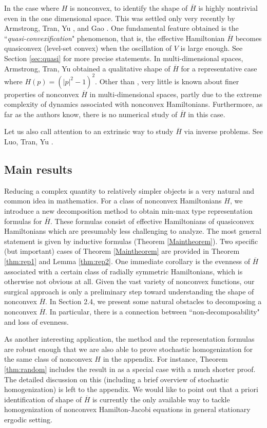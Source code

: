 \documentclass[12pt,reqno]{amsart}
\theoremstyle{plain}
\theoremstyle{remark}
\numberwithin{equation}{section}
\newcommand{\ol}{\overline}
\begin{document}
In the case where $H$ is nonconvex, to identify   the shape of $\ol{H}$ is highly nontrivial even in  the one dimensional space. 
This was settled only very recently by  Armstrong, Tran, Yu \cite{ATY2}, and Gao \cite{Gao}.  
One fundamental feature obtained is the  ``{\it quasi-convexification}" phenomenon, that is, 
the effective Hamiltonian $\ol H$ becomes quasiconvex (level-set convex)   when the oscillation of $V$ is large enough. 
See Section \ref{sec:quasi} for more precise statements. 
In multi-dimensional spaces,
 Armstrong, Tran, Yu \cite{ATY1} obtained a qualitative shape of $\ol{H}$ for a representative case where $H(p)=(|p|^2-1)^2$.
Other than \cite{ATY1}, very little is known about finer properties of nonconvex $\ol{H}$ in multi-dimensional spaces, partly due to the extreme complexity of dynamics associated with nonconvex Hamiltonians.  Furthermore, as far as the authors know, there is no numerical study of $\ol{H}$ in this case.

Let us also call attention to an extrinsic way to study $\ol{H}$ via inverse problems. 
See Luo, Tran, Yu \cite{LTY}.


\subsection{Main results}
Reducing a complex quantity to relatively simpler objects is a very natural and common idea in  mathematics.  
For a class of nonconvex Hamiltonians $H$,  we introduce a new decomposition method to obtain min-max type representation formulas for $\ol{H}$.  
These formulas  consist of   effective Hamiltonians of quasiconvex Hamiltonians which are presumably less challenging  to analyze.  
The most general statement is given by inductive formulas (Theorem \ref{Maintheorem}).  
Two specific (but important) cases of Theorem \ref{Maintheorem}  are provided in Theorem  \ref{thm:rep1} and Lemma \ref{thm:rep2}.   
One immediate corollary is the evenness of $\ol H$ associated with a certain class of radially symmetric Hamiltonians, which is otherwise not obvious at all.  Given the vast  variety of  nonconvex functions,    our surgical approach is only a preliminary step toward understanding the shape of nonconvex $\ol H$.  In Section 2.4, we present some natural obstacles to decomposing a nonconvex $\ol H$. In particular, there is a connection between ``non-decomposability" and loss of evenness.  



As another interesting application,  the method and the representation formulas are robust enough that 
we are also able to prove stochastic homogenization for the same class of nonconvex $H$ in the appendix. 
For instance,   Theorem \ref{thm:random}   includes the result in \cite{ATY1} as a special case with a much shorter proof.  
The detailed discussion on this (including a brief overview of stochastic homogenization) is left to the appendix.
We would like to point out  that a priori identification of shape of $\ol H$ is currently  the only  available way to  tackle  homogenization of  nonconvex Hamilton-Jacobi equations  in general stationary ergodic setting. 
\end{document}
